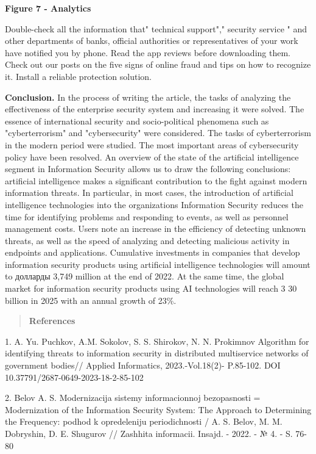 \textbf{Figure 7 - Analytics}

Double-check all the information that" technical support"," security
service " and other departments of banks, official authorities or
representatives of your work have notified you by phone. Read the app
reviews before downloading them. Check out our posts on the five signs
of online fraud and tips on how to recognize it. Install a reliable
protection solution.

\textbf{Conclusion.} In the process of writing the article, the tasks of
analyzing the effectiveness of the enterprise security system and
increasing it were solved. The essence of international security and
socio-political phenomena such as "cyberterrorism" and "cybersecurity"
were considered. The tasks of cyberterrorism in the modern period were
studied. The most important areas of cybersecurity policy have been
resolved. An overview of the state of the artificial intelligence
segment in Information Security allows us to draw the following
conclusions: artificial intelligence makes a significant contribution to
the fight against modern information threats. In particular, in most
cases, the introduction of artificial intelligence technologies into the
organization\textquotesingle s Information Security reduces the time for
identifying problems and responding to events, as well as personnel
management costs. Users note an increase in the efficiency of detecting
unknown threats, as well as the speed of analyzing and detecting
malicious activity in endpoints and applications. Cumulative investments
in companies that develop information security products using artificial
intelligence technologies will amount to долларды 3,749 million at the
end of 2022. At the same time, the global market for information
security products using AI technologies will reach 3 30 billion in 2025
with an annual growth of 23\%.

\begin{quote}
\textbf{References}
\end{quote}

1. A. Yu. Puchkov, A.M. Sokolov, S. S. Shirokov, N. N. Prokimnov
Algorithm for identifying threats to information security in distributed
multiservice networks of government bodies// Applied Informatics,
2023.-Vol.18(2)- P.85-102. DOI 10.37791/2687-0649-2023-18-2-85-102

2. Belov A. S. Modernizacija sistemy informacionnoj bezopasnosti =
Modernization of the Information Security System: The Approach to
Determining the Frequency: podhod k opredeleniju periodichnosti / A. S.
Belov, M. M. Dobryshin, D. E. Shugurov // Zashhita informacii. Insajd. -
2022. - № 4. - S. 76-80


